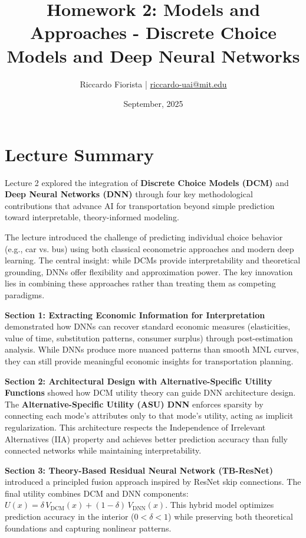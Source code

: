 \documentclass[11pt]{article}
\title{Homework 2: Models and Approaches - Discrete Choice Models and Deep Neural Networks}
\author{Riccardo Fiorista | \href{mailto:riccardo-uai@mit.edu}{riccardo-uai@mit.edu}}
\date{September, 2025}
\begin{document}
\maketitle
\thispagestyle{fancy} %

\section*{Lecture Summary}

Lecture 2 explored the integration of \textbf{Discrete Choice Models (DCM)} and \textbf{Deep Neural Networks (DNN)} through four key methodological contributions that advance AI for transportation beyond simple prediction toward interpretable, theory-informed modeling.

The lecture introduced the challenge of predicting individual choice behavior (e.g., car vs. bus) using both classical econometric approaches and modern deep learning. The central insight: while DCMs provide interpretability and theoretical grounding, DNNs offer flexibility and approximation power. The key innovation lies in combining these approaches rather than treating them as competing paradigms.

\textbf{Section 1: Extracting Economic Information for Interpretation} demonstrated how DNNs can recover standard economic measures (elasticities, value of time, substitution patterns, consumer surplus) through post-estimation analysis. While DNNs produce more nuanced patterns than smooth MNL curves, they can still provide meaningful economic insights for transportation planning.

\textbf{Section 2: Architectural Design with Alternative-Specific Utility Functions} showed how DCM utility theory can guide DNN architecture design. The \textbf{Alternative-Specific Utility (ASU) DNN} enforces sparsity by connecting each mode's attributes only to that mode's utility, acting as implicit regularization. This architecture respects the Independence of Irrelevant Alternatives (IIA) property and achieves better prediction accuracy than fully connected networks while maintaining interpretability.

\textbf{Section 3: Theory-Based Residual Neural Network (TB-ResNet)} introduced a principled fusion approach inspired by ResNet skip connections. The final utility combines DCM and DNN components: $U(x) = \delta \, V_{\text{DCM}}(x) + (1-\delta) \, V_{\text{DNN}}(x)$. This hybrid model optimizes prediction accuracy in the interior ($0 < \delta < 1$) while preserving both theoretical foundations and capturing nonlinear patterns.
\end{document}
